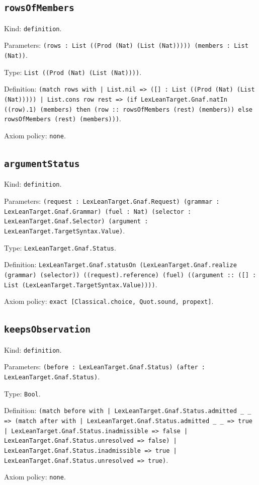 \documentclass[11pt]{article}
\begin{document}
\subsection*{\texttt{rowsOfMembers}}
\noindent Kind: \texttt{definition}.\par
\noindent Parameters: \texttt{(rows : List ((Prod (Nat) (List (Nat))))) (members : List (Nat))}.\par
\noindent Type: \texttt{List ((Prod (Nat) (List (Nat))))}.\par
\noindent Definition: \texttt{(match rows with | List.nil => ([] : List ((Prod (Nat) (List (Nat))))) | List.cons row rest => (if LexLeanTarget.Gnaf.natIn ((row).1) (members) then (row :: rowsOfMembers (rest) (members)) else rowsOfMembers (rest) (members)))}.\par
\noindent Axiom policy: \texttt{none}.\par
\subsection*{\texttt{argumentStatus}}
\noindent Kind: \texttt{definition}.\par
\noindent Parameters: \texttt{(request : LexLeanTarget.Gnaf.Request) (grammar : LexLeanTarget.Gnaf.Grammar) (fuel : Nat) (selector : LexLeanTarget.Gnaf.Selector) (argument : LexLeanTarget.TargetSyntax.Value)}.\par
\noindent Type: \texttt{LexLeanTarget.Gnaf.Status}.\par
\noindent Definition: \texttt{LexLeanTarget.Gnaf.statusOn (LexLeanTarget.Gnaf.realize (grammar) (selector)) ((request).reference) (fuel) ((argument :: ([] : List (LexLeanTarget.TargetSyntax.Value))))}.\par
\noindent Axiom policy: \texttt{exact [Classical.choice, Quot.sound, propext]}.\par
\subsection*{\texttt{keepsObservation}}
\noindent Kind: \texttt{definition}.\par
\noindent Parameters: \texttt{(before : LexLeanTarget.Gnaf.Status) (after : LexLeanTarget.Gnaf.Status)}.\par
\noindent Type: \texttt{Bool}.\par
\noindent Definition: \texttt{(match before with | LexLeanTarget.Gnaf.Status.admitted \_ \_ => (match after with | LexLeanTarget.Gnaf.Status.admitted \_ \_ => true | LexLeanTarget.Gnaf.Status.inadmissible => false | LexLeanTarget.Gnaf.Status.unresolved => false) | LexLeanTarget.Gnaf.Status.inadmissible => true | LexLeanTarget.Gnaf.Status.unresolved => true)}.\par
\noindent Axiom policy: \texttt{none}.\par
\end{document}
